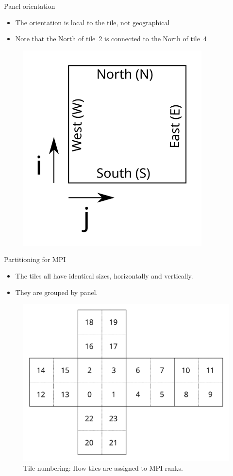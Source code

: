 \documentclass{beamer}
\begin{document}
\begin{frame}{Panel orientation}
\begin{itemize}
    \item The orientation is local to the tile, not geographical
    \item Note that the North of tile~2 is connected to the North of tile~4
\end{itemize}
\begin{figure}
    \includegraphics[scale=0.9]{img/tile_orientation}
\end{figure}
\end{frame}

\begin{frame}{Partitioning for MPI}
\begin{itemize}
    \item The tiles all have identical sizes, horizontally and vertically.
    \item They are grouped by panel.
\end{itemize}
\begin{figure}
    \includegraphics[scale=0.6]{img/multi_tile_numbering}
    \caption{Tile numbering: How tiles are assigned to MPI ranks.}
\end{figure}
\end{frame}
\end{document}
